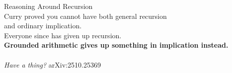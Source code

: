 \documentclass[aspectratio=169,11pt]{beamer}
\newcommand{\key}[1]{{\color{accent}\textbf{#1}}}
\begin{document}
\begin{frame}[plain]
  \vfill
  \begin{center}
    {\Large Reasoning Around Recursion}\\[2em]
    \small
    Curry proved you cannot have both general recursion\\
    and ordinary implication.\\[1em]
    Everyone since has given up recursion.\\[1em]
    \key{Grounded arithmetic gives up something in implication instead.}\\[1.8em]
    \\[0.4em]
    {\footnotesize \emph{Have a thing?} \quad arXiv:2510.25369}
  \end{center}
  \vfill
\end{frame}
\end{document}
